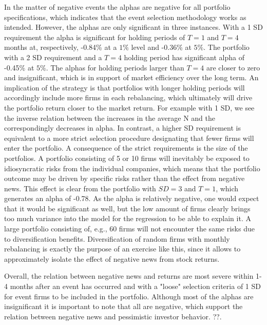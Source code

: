 In the matter of negative events the alphas are negative for all portfolio specifications, which indicates that the event selection methodology works as intended. However, the alphas are only significant in three instances. With a 1 SD requirement the alpha is significant for holding periods of $T = 1$ and $T = 4$ months at, respectively, -0.84\% at a $1\%$ level and -0.36\% at $5\%$. The portfolio with a 2 SD requirement and a $T=4$ holding period has significant alpha of -0.45\% at $5\%$. The alphas for holding periods larger than $T = 4$ are closer to zero and insignificant, which is in support of market efficiency over the long term. An implication of the strategy is that portfolios with longer holding periods will accordingly include more firms in each rebalancing, which ultimately will drive the portfolio return closer to the market return. For example with 1 SD, we see the inverse relation between the increases in the average N and the correspondingly decreases in alpha. In contrast, a higher SD requirement is equivalent to a more strict selection procedure designating that fewer firms will enter the portfolio. A consequence of the strict requirements is the size of the portfolios. A portfolio consisting of 5 or 10 firms will inevitably be exposed to idiosyncratic risks from the individual companies, which means that the portfolio outcome may be driven by specific risks rather than the effect from negative news. This effect is clear from the portfolio with $SD = 3$ and $T=1$, which generates an alpha of -0.78. As the alpha is relatively negative, one would expect that it would be significant as well, but the low amount of firms clearly brings too much variance into the model for the regression to be able to explain it. A large portfolio consisting of, e.g., 60 firms will not encounter the same risks due to diversification benefits. Diversification of random firms with monthly rebalancing is exactly the purpose of an exercise like this, since it allows to approximately isolate the effect of negative news from stock returns. 



Overall, the relation between negative news and returns are most severe within 1-4 months after an event has occurred and with a "loose" selection criteria of 1 SD for event firms to be included in the portfolio. Although most of the alphas are insignificant it is important to note that all are negative, which support the relation between negative news and pessimistic investor behavior.  
??. 



